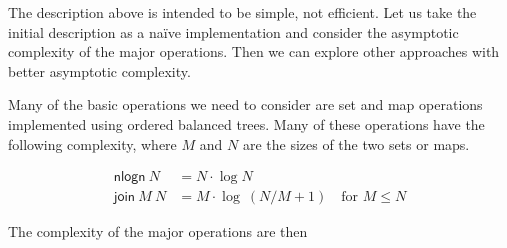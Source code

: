 \documentclass{article}
\begin{document}
The description above is intended to be simple, not efficient. Let us take the
initial description as a na\"ive implementation and consider the asymptotic
complexity of the major operations. Then we can explore other approaches with
better asymptotic complexity.

Many of the basic operations we need to consider are set and map operations
implemented using ordered balanced trees. Many of these operations have the
following complexity, where $M$ and $N$ are the sizes of the two sets or maps.

\begin{equation*}
\begin{split}
\mathsf{nlogn} ~ N & = N \cdot \log N \\
\mathsf{join} ~ M ~ N & = M \cdot \log ~ (N/M + 1) \quad \text{for } M \leq N
\end{split}
\end{equation*}

The complexity of the major operations are then
\end{document}

